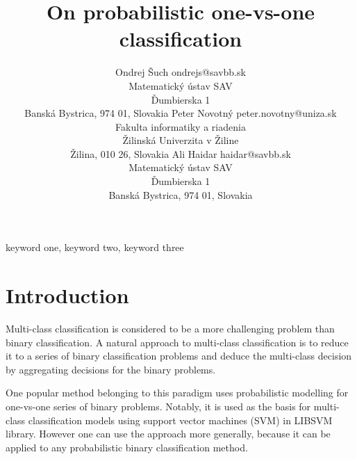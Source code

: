 \documentclass[twoside,11pt]{article}
\begin{document}
\title{On probabilistic one-vs-one classification}

\author{\name Ondrej Šuch \email ondrejs@savbb.sk \\
       \addr Matematický ústav SAV\\
       Ďumbierska 1\\
       Banská Bystrica, 974 01, Slovakia
       \AND
       \name Peter Novotný \email peter.novotny@uniza.sk \\
       \addr Fakulta informatiky a riadenia\\
       Žilinská Univerzita v Žiline\\
       Žilina, 010 26, Slovakia
       \AND
       \name Ali Haidar \email haidar@savbb.sk \\
       \addr Matematický ústav SAV\\
       Ďumbierska 1\\
       Banská Bystrica, 974 01, Slovakia
       }


\maketitle

\begin{abstract}%
\blindtext
\end{abstract}

\begin{keywords}
  keyword one, keyword two, keyword three
\end{keywords}

\section{Introduction}


Multi-class classification is considered to be a more challenging problem than binary classification.  A natural approach to multi-class classification is to reduce it to a series of binary classification problems and deduce the multi-class decision by aggregating decisions for the binary problems. 

One popular method belonging to  this paradigm uses probabilistic modelling for one-vs-one series of binary problems. Notably, it is used as the basis for multi-class classification models using support vector machines (SVM) in LIBSVM library. However one can use the approach more generally,  because it can be applied to any probabilistic binary classification method. 
\end{document}
